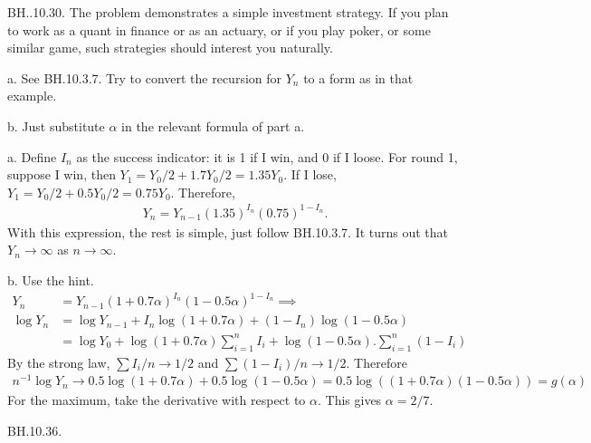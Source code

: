 \begin{exercise}
BH..10.30. The problem demonstrates a simple investment strategy.
If you plan to work as a quant in finance or as an actuary, or if you play poker, or some similar game, such strategies should interest you naturally.

\begin{hint}
a. See BH.10.3.7. Try to convert the recursion for $Y_n$ to a form as in that example.

b. Just substitute $\alpha$ in the relevant formula of part a.
\end{hint}
\begin{solution}
a. Define $I_n$ as the success indicator: it is 1 if I win, and 0 if I loose.  For round 1, suppose I win, then $Y_{1} = Y_0/2 + 1.7 Y_0/2= 1.35 Y_{0}$. If I lose,
$Y_{1} = Y_0/2 + 0.5 Y_0/2= 0.75 Y_{0}$. Therefore,
\begin{align*}
Y_n = Y_{n-1} (1.35)^{I_{n}}(0.75)^{1-I_{n}}.
\end{align*}
With this expression, the rest  is simple, just  follow  BH.10.3.7.
It turns out that $Y_n\to\infty$ as $n\to\infty$.

b. Use the hint.
\begin{align*}
Y_n &= Y_{n-1} (1+0.7\alpha)^{I_{n}}(1-0.5\alpha)^{1-I_{n}} \implies \\
\log Y_n &= \log Y_{n-1}  + I_{n} \log(1+0.7\alpha) + (1-I_{n})\log (1-0.5\alpha)  \\
& = \log Y_{0}  + \log(1+0.7\alpha) \sum_{i=1}^{n}I_{i}  + \log(1-0.5\alpha).\sum_{i=1}^{n} (1-I_{i})
\end{align*}
By the strong law, $\sum I_i/n \to 1/2$ and $\sum (1-I_{i})/n \to 1/2$. Therefore
\begin{align*}
n^{-1}\log Y_n \to 0.5 \log(1+0.7\alpha) + 0.5\log(1-0.5\alpha) = 0.5 \log( (1+0.7\alpha)(1-0.5\alpha)) = g(\alpha)
\end{align*}
For the maximum, take the derivative with respect to $\alpha$. This gives $\alpha=2/7$.
\end{solution}
\end{exercise}

\begin{exercise}
BH.10.36.
\end{exercise}


